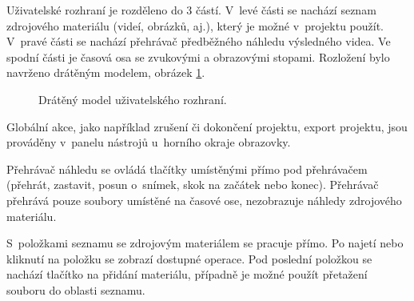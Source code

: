 Uživatelské rozhraní je rozděleno do 3 částí. V~levé části se nachází seznam zdrojového materiálu (videí, obrázků, aj.), který je možné v~projektu použít. V~pravé části se nachází přehrávač předběžného náhledu výsledného videa. Ve spodní části je časová osa se zvukovými a obrazovými stopami. Rozložení bylo navrženo drátěným modelem, obrázek \ref{img:wireframe}.

\begin{figure}[h]
	\centering
	\caption{Drátěný model uživatelského rozhraní.}\label{img:wireframe}
\end{figure}

Globální akce, jako například zrušení či dokončení projektu, export projektu, jsou prováděny v~panelu nástrojů u~horního okraje obrazovky.

Přehrávač náhledu se ovládá tlačítky umístěnými přímo pod přehrávačem (přehrát, zastavit, posun o~snímek, skok na začátek nebo konec). Přehrávač přehrává pouze soubory umístěné na časové ose, nezobrazuje náhledy zdrojového materiálu.

S~položkami seznamu se zdrojovým materiálem se pracuje přímo. Po najetí nebo kliknutí na položku se zobrazí dostupné operace. Pod poslední položkou se nachází tlačítko na přidání materiálu, případně je možné použít přetažení souboru do oblasti seznamu.

